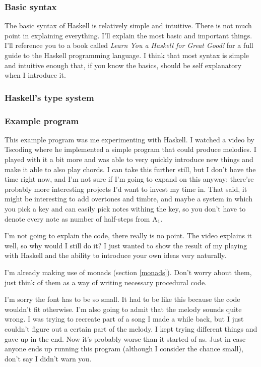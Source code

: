 \documentclass[11pt]{article}
\begin{document}
\subsubsection{Basic syntax}

The basic syntax of Haskell is relatively simple and intuitive. There is not
much point in explaining everything. I'll explain the most basic and important
things. I'll reference you to a book called \emph{Learn You a Haskell for Great
Good!} for a full guide to the Haskell programming language. I think that most
syntax is simple and intuitive enough that, if you know the basics, should be
self explanatory when I introduce it.


\subsubsection{Haskell's type system}\label{types}

\subsubsection{Example program}


This example program was me experimenting with Haskell. I watched a video by
Tscoding where he implemented a simple program that could produce melodies. I
played with it a bit more and was able to very quickly introduce new things and
make it able to also play chords. I can take this further still, but I don't
have the time right now, and I'm not sure if I'm going to expand on this
anyway; there're probably more interesting projects I'd want to invest my time
in. That said, it might be interesting to add overtones and timbre, and maybe a
system in which you pick a key and can easily pick notes withing the key, so
you don't have to denote every note as number of half-steps from A\(_1\).

I'm not going to explain the code, there really is no point. The video explains
it well, so why would I still do it? I just wanted to show the result of my
playing with Haskell and the ability to introduce your own ideas very
naturally.

I'm already making use of monads (section \ref{monads}). Don't worry about
them, just think of them as a way of writing necessary procedural code.

I'm sorry the font has to be so small. It had to be like this because the code
wouldn't fit otherwise. I'm also going to admit that the melody sounds quite
wrong. I was trying to recreate part of a song I made a while back, but I just
couldn't figure out a certain part of the melody. I kept trying different
things and gave up in the end. Now it's probably worse than it started of as.
Just in case anyone ends up running this program (although I consider the
chance small), don't say I didn't warn you.
\end{document}
